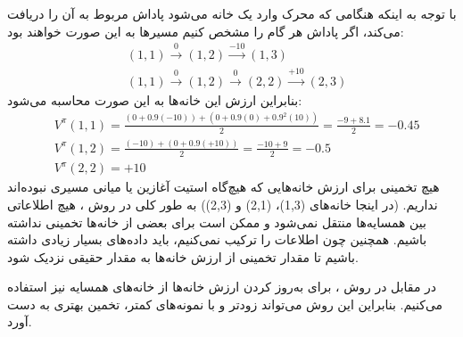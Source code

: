 \begin{ابجد}
\item با توجه به اینکه هنگامی که محرک وارد یک خانه می‌شود پاداش مربوط به آن را دریافت می‌کند، اگر پاداش هر گام را مشخص کنیم مسیرها به این صورت خواهند بود:
\begin{align*}
     & (1,1) \xrightarrow{0} (1,2) \xrightarrow{-10} (1,3)                       \\
     & (1,1) \xrightarrow{0} (1,2) \xrightarrow{0} (2,2) \xrightarrow{+10} (2,3)
\end{align*}
بنابراین ارزش این خانه‌ها به این صورت محاسبه می‌شود:
\begin{align*}
     & V^{\pi}(1,1) = \frac{(0 + 0.9(-10)) + (0 + 0.9(0) + 0.9^2(10))}{2} = \frac{-9 + 8.1}{2} = -0.45 \\
     & V^{\pi}(1,2) = \frac{(-10) + (0 + 0.9(+10))}{2} = \frac{-10 + 9}{2} = -0.5                      \\
     & V^{\pi}(2,2) = +10
\end{align*}
هیچ تخمینی برای ارزش خانه‌هایی که هیچ‌گاه استیت آغازین یا میانی مسیری نبوده‌اند نداریم. (در اینجا خانه‌های (1,3)، (2,1) و (2,3)) به طور کلی در روش ، هیچ اطلاعاتی بین همسایه‌ها منتقل نمی‌شود و ممکن است برای بعضی از خانه‌ها تخمینی نداشته باشیم. همچنین چون اطلاعات را ترکیب نمی‌کنیم، باید داده‌های بسیار زیادی داشته باشیم تا مقدار تخمینی از ارزش خانه‌ها به مقدار حقیقی نزدیک شود.

در مقابل در روش ، برای به‌روز کردن ارزش خانه‌ها از خانه‌های همسایه نیز استفاده می‌کنیم. بنابراین این روش می‌تواند زودتر و با نمونه‌های کمتر، تخمین بهتری به دست آورد.

\end{ابجد}